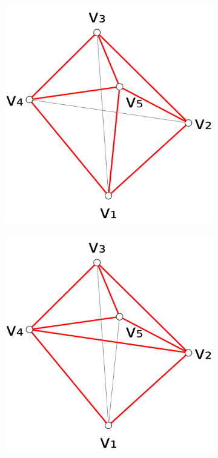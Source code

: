 \begin{figure}[ht]
\begin{subfigure}{0.3\textwidth}
    \includegraphics[width=\textwidth]{img/example_triangulation_2.pdf}
    \caption{}
  \end{subfigure}
  \hspace{0em}
  \VRule
  \hspace{0em}
  \begin{subfigure}{0.3\textwidth}
    \centering
    \includegraphics[width=\textwidth]{img/example_triangulation_3.pdf}
    \caption{}
  \end{subfigure}
  

\end{figure}
